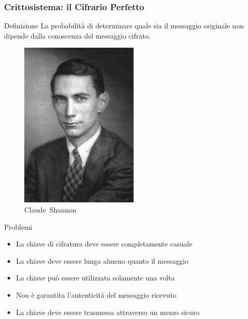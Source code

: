 \documentclass{beamer}
\begin{document}
\begin{frame}
  \frametitle{Crittosistema: il Cifrario Perfetto}

  \begin{block}{Definizione}
    La probabilità di determinare quale sia il messaggio originale non
    dipende dalla conoscenza del messaggio cifrato.
  \end{block}

  \begin{minipage}{.25\linewidth}
    \begin{figure}
      \centering
      \includegraphics[width=.9\linewidth]{img/shannon.jpeg}
      \caption{Claude~Shannon}
      \label{fig:shannon}
    \end{figure}
  \end{minipage}
  \pause
  \hfill
  \begin{minipage}{.70\linewidth}
    \begin{block}{Problemi}
      \begin{itemize}
        \item La chiave di cifratura deve essere completamente casuale
        \item La chiave deve essere lunga almeno quanto il messaggio
        \item La chiave può essere utilizzata solamente una volta
        \item Non è garantita l'autenticità del messaggio ricevuto
        \item<3-> La chiave deve essere trasmessa attraverso un mezzo sicuro
      \end{itemize}
    \end{block}
  \end{minipage}


\end{frame}
\end{document}
